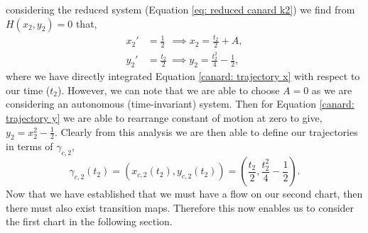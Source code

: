 considering the reduced system (Equation \ref{eq: reduced canard k2}) we find from $ H(x_2,y_2)=0 $ that,
\begin{subequations}
	\begin{align}
	x_2'&=\frac{1}{2}\ \	\implies x_2=\frac{t_2}{2}+A, \label{canard: trajectory x}\\
	y_2'&=\frac{t_2}{2}\ \implies y_2=\frac{t_2^2}{4}-\frac{1}{2}, \label{canard: trajectory y}
	\end{align}
\end{subequations} 
where we have directly integrated Equation \ref{canard: trajectory x} with respect to our time ($ t_2 $). However, we can note that we are able to choose $ A=0 $ as we are considering an autonomous (time-invariant) system. Then for Equation \ref{canard: trajectory y} we are able to rearrange constant of motion at zero to give, $ y_2=x_2^2-\frac{1}{2} $. Clearly from this analysis we are then able to define our trajectories in terms of $ \gamma_{c,2} $, 
\begin{equation}
\gamma_{c,2}(t_2)=(x_{c,2}(t_2),y_{c,2}(t_2))=\left(\frac{t_2}{2},\frac{t^2_2}{4}-\frac{1}{2}\right).   
\end{equation}
Now that we have established that we must have a flow on our second chart, then there must also exist transition maps. Therefore this now enables us to consider the first chart in the following section.


